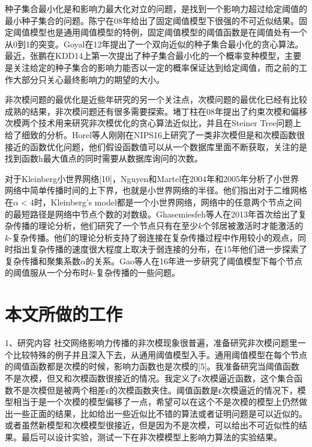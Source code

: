 种子集合最小化是和影响力最大化对立的问题，是找到一个影响力超过给定阈值的最小种子集合的问题。陈宁在08年\cite{Chen2008approximability}给出了固定阈值模型下很强的不可近似结果。固定阈值模型也是通用阈值模型的特例，固定阈值模型的阈值函数是在阈值处有一个从0到1的突变。Goyal在12年\cite{goyal2012minimizing}提出了一个双向近似的种子集合最小化的贪心算法。最近，张鹏\cite{zhang2014prob}在KDD14上第一次提出了种子集合最小化的一个概率变种模型，主要是关注给定的种子集合的影响力能否以一定的概率保证达到给定阈值，而之前的工作大部分只关心最终影响力的期望的大小。


非次模问题的最优化是近些年研究的另一个关注点，次模问题的最优化已经有比较成熟的结果，非次模问题还有很多需要探索。堵丁柱\cite{du2008analysis}在08年提出了约束次模和偏移次模两个技术用来研究非次模优化的贪心算法近似比，并且在Steiner Tree问题上给了细致的分析。Horel等人\cite{Horel2016sub}刚刚在NIPS16上研究了一类非次模但是和次模函数很接近的函数优化问题，他们假设函数值可以从一个数据库里面不断获取，关注的是找到函数h最大值点的同时需要从数据库询问的次数。

对于Kleinberg小世界网络[10]，Nguyen和Martel在2004年\cite{Martel2004analyzing}和2005年\cite{Nguyen2005analyzing}分析了小世界网络中简单传播时间的上下界，也就是小世界网络的半径。他们指出对于二维网格在$\alpha<4$时，Kleinberg’s model都是一个小世界网络，网络中的任意两个节点之间的最短路径是网络中节点个数的对数级。Ghasemiesfeh等人\cite{Ghasemiesfeh2013complex}在2013年首次给出了复杂传播的理论分析，他们研究了一个节点只有在至少$k$个邻居被激活时才能激活的$k$-复杂传播。他们的理论分析支持了弱连接在复杂传播过程中作用较小的观点，同时指出复杂传播的速度很大程度上取决于弱连接的分布，在15年\cite{ebrahimi2015complex}他们进一步探索了复杂传播和聚集系数$\alpha$的关系。Gao等人在16年\cite{gao2016gt}进一步研究了阈值模型下每个节点的阈值服从一个分布时$k$-复杂传播的一些问题。




\section{本文所做的工作}
1、研究内容
社交网络影响力传播的非次模现象很普遍，准备研究非次模问题里一个比较特殊的例子并且深入下去，从通用阈值模型入手。通用阈值模型在每个节点的阈值函数都是次模的时候，影响力函数也是次模的[5]。我准备研究当阈值函数不是次模，但又和次模函数很接近的情况。我定义了ε次模逼近函数，这个集合函数不是次模但是被两个相差ε的次模函数夹住。阈值函数是ε次模逼近的情况下，模型相当于是一个次模的模型偏移了一点，希望可以在这个不是次模的模型上仍然做出一些正面的结果，比如给出一些近似比不错的算法或者证明问题是可以近似的。或者虽然新模型和次模模型很接近，但是因为不是次模，可以给出不可近似性的结果。最后可以设计实验，测试一下在非次模模型上影响力算法的实验结果。

